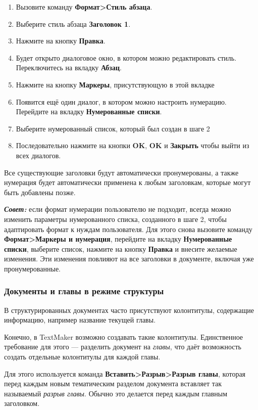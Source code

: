 ﻿\documentclass[a4paper,10pt]{article}
\begin{document}
\begin{enumerate}
 \item Вызовите команду \textbf{Формат>Стиль абзаца}.
 \item Выберите стиль абзаца \textbf{Заголовок 1}.
 \item Нажмите на кнопку \textbf{Правка}.
 \item Будет открыто диалоговое окно, в котором можно редактировать стиль. Переключитесь на вкладку \textbf{Абзац}.
 \item Нажмите на кнопку \textbf{Маркеры}, присутствующую в этой вкладке
 \item Появится ещё один диалог, в котором можно настроить нумерацию. Перейдите на вкладку \textbf{Нумерованные списки}.
 \item Выберите нумерованный список, который был создан в шаге 2
 \item Последовательно нажмите на кнопки \textbf{OK}, \textbf{OK} и \textbf{Закрыть} чтобы выйти из всех диалогов.
\end{enumerate}

Все существующие заголовки будут автоматически пронумерованы, а также нумерация будет автоматически применена к любым заголовкам, которые могут быть добавлены позже.

\begin{mdframed}[backgroundcolor=blue!10]
\textbf{\textit{Совет:}} если формат нумерации пользователю не подходит, всегда можно изменить параметры нумерованного списка, созданного в шаге 2, чтобы адаптировать формат к нуждам пользователя. Для этого снова вызовите команду \textbf{Формат>Маркеры и нумерация}, перейдите на вкладку \textbf{Нумерованные списки}, выберите список, нажмите на кнопку \textbf{Правка} и внесите желаемые изменения. Эти изменения повлияют на все заголовки в документе, включая уже пронумерованные.
\end{mdframed}

\subsubsection{Документы и главы в режиме структуры}
 В структурированных документах часто присутствуют колонтитулы, содержащие информацию, например название текущей главы.
 
 Конечно, в TextMaker возможно создавать такие колонтитулы. Единственное требование для этого — разделить документ на \textit{главы}, что даёт возможность создать отдельные колонтитулы для каждой главы.
 
 Для этого используется команда \textbf{Вставить>Разрыв>Разрыв главы}, которая перед каждым новым тематическим разделом документа вставляет так называемый \textit{разрыв главы}. Обычно это делается перед каждым главным заголовком.
 
\end{document}
